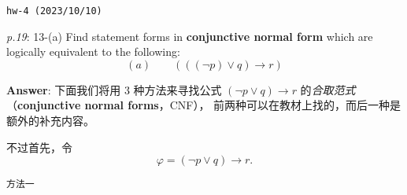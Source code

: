 \documentclass[UTF8,12pt,a4paper]{ctexart}
\begin{document}
\noindent\texttt{hw-4 (2023/10/10)}

\emph{p.19}: 13-(a) \quad
Find statement forms in \textbf{conjunctive normal form} which are logically equivalent to the following:
\[
(a) \qquad (((\neg p)  \lor q) \to r)
\] 

\noindent\textbf{Answer}: 
下面我们将用 3 种方法来寻找公式 $(\neg p \lor q) \to r$ 的\textit{合取范式} （\textbf{conjunctive normal forms}，CNF），
前两种可以在教材上找的，而后一种是额外的补充内容。

不过首先，令 
\[
\varphi = (\neg p \lor q) \to r.
\]

\noindent\texttt{方法一}
\end{document}
